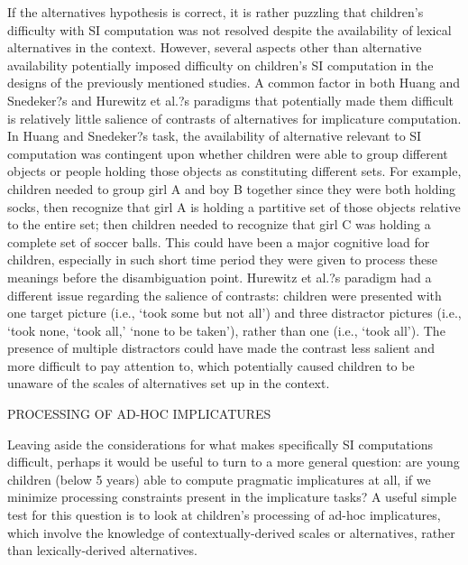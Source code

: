 If the alternatives hypothesis is correct, it is rather puzzling that children's difficulty with SI computation was not resolved despite the availability of lexical alternatives in the context. However, several aspects other than alternative availability potentially imposed difficulty on children's SI computation in the designs of the previously mentioned studies. A common factor in both Huang and Snedeker?s and Hurewitz et al.?s paradigms that potentially made them difficult is relatively little salience of contrasts of alternatives for implicature computation. In Huang and Snedeker?s task, the availability of alternative relevant to SI computation was contingent upon whether children were able to group different objects or people holding those objects as constituting different sets. For example, children needed to group girl A and boy B together since they were both holding socks, then recognize that girl A is holding a partitive set of those objects relative to the entire set; then children needed to recognize that girl C was holding a complete set of soccer balls. This could have been a major cognitive load for children, especially in such short time period they were given to process these meanings before the disambiguation point. Hurewitz et al.?s paradigm had a different issue regarding the salience of contrasts: children were presented with one target picture (i.e., `took some but not all') and three distractor pictures (i.e., `took none, `took all,' `none to be taken'), rather than one (i.e., `took all'). The presence of multiple distractors could have made the contrast less salient and more difficult to pay attention to, which potentially caused children to be unaware of the scales of alternatives set up in the context. 

PROCESSING OF AD-HOC IMPLICATURES

Leaving aside the considerations for what makes specifically SI computations difficult, perhaps it would be useful to turn to a more general question: are young children (below 5 years) able to compute pragmatic implicatures at all, if we minimize processing constraints present in the implicature tasks? A useful simple test for this question is to look at children's processing of ad-hoc implicatures, which involve the knowledge of contextually-derived scales or alternatives, rather than lexically-derived alternatives. 

